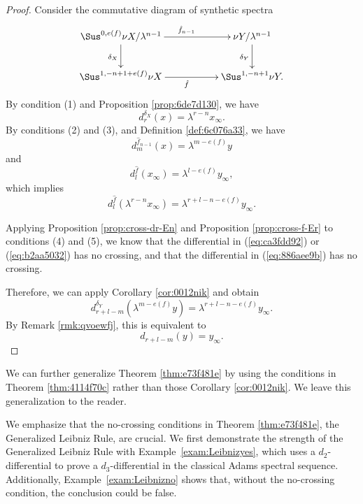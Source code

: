 \documentclass{amsart}
\numberwithin{equation}{section}
\begin{document}
\begin{proof}
    Consider the commutative diagram of synthetic spectra
    $$\xymatrix{
        \Sus^{0,e(f)}\nu X/\lambda^{n-1} \ar[rr]^{\hat f_{n-1}}\ar[d]_{\delta_X} && \nu Y/\lambda^{n-1}\ar[d]_{\delta_Y}\\
        \Sus^{1,-n+1+e(f)} \nu X \ar[rr]_{\hat f} && \Sus^{1,-n+1}\nu Y.
    }$$
    By condition (1) and Proposition \ref{prop:6de7d130}, we have
    \begin{equation}\label{eq:ca3fdd92}
        d^{\delta_X}_r(x)=\lambda^{r-n}x_\infty.
    \end{equation}
    By conditions (2) and (3), and Definition \ref{def:6c076a33}, we have
    \begin{equation}\label{eq:b2aa5032}
        d^{\hat f_{n-1}}_m(x)=\lambda^{m-e(f)} y
    \end{equation}
    and
    \begin{equation*}
        d^{\hat f}_l(x_\infty)=\lambda^{l-e(f)} y_\infty, 
    \end{equation*}
    which implies
    \begin{equation}\label{eq:886aee9b}
         d^{\hat f}_l(\lambda^{r-n}x_\infty)=\lambda^{r+l-n-e(f)}y_\infty.
    \end{equation}
    
    Applying Proposition \ref{prop:cross-dr-En} and Proposition \ref{prop:cross-f-Er} to conditions (4) and (5), we know that the differential in (\ref{eq:ca3fdd92}) or (\ref{eq:b2aa5032}) has no crossing, and that the differential in (\ref{eq:886aee9b}) has no crossing.
    
    Therefore, we can apply Corollary \ref{cor:0012nik} and obtain
    $$d^{\delta_Y}_{r+l-m}(\lambda^{m-e(f)} y)=\lambda^{r+l-n-e(f)} y_\infty.$$
    By Remark \ref{rmk:qvoewfj}, this is equivalent to
    $$d_{r+l-m}(y)= y_\infty.$$
\end{proof}

\begin{remark}
    We can further generalize Theorem \ref{thm:e73f481e} by using the conditions in Theorem \ref{thm:4114f70c} rather than those Corollary \ref{cor:0012nik}. We leave this generalization to the reader.
\end{remark}

We emphasize that the no-crossing conditions in Theorem \ref{thm:e73f481e}, the Generalized Leibniz Rule, are crucial. We first demonstrate the strength of the Generalized Leibniz Rule with Example~\ref{exam:Leibnizyes}, which uses a $d_2$-differential to prove a $d_3$-differential in the classical Adams spectral sequence. Additionally, Example~\ref{exam:Leibnizno} shows that, without the no-crossing condition, the conclusion could be false.
\end{document}
